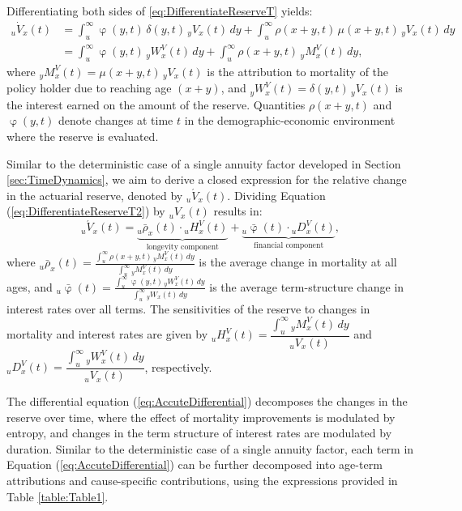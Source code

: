 \documentclass[12pt]{article}
\begin{document}
Differentiating both sides of \eqref{eq:DifferentiateReserveT} yields:
\begin{equation}\label{eq:DifferentiateReserveT2}
	\begin{split}
		{}_u\dot{V}_x(t) &= \int_u^\infty \upvarphi(y,t) \, \delta(y,t) \, {}_yV_x(t) \, dy + \int_u^\infty \rho(x+y,t) \, \mu(x+y,t) \, {}_yV_x(t) \, dy \\ 
		&= \int_u^\infty \upvarphi(y,t) \, {}_yW^V_x(t) \, dy + \int_u^\infty \rho(x+y,t) \, {}_yM^V_x(t) \, dy,
	\end{split}
\end{equation}
where ${}_yM^V_x(t) = \mu(x+y,t) \, {}_yV_x(t)$ is the attribution to mortality of the policy holder due to reaching age $(x+y)$, and ${}_yW^V_x(t) = \delta(y,t) \, {}_yV_x(t)$ is the interest earned on the amount of the reserve. Quantities $\rho(x+y,t)$ and $\upvarphi(y,t)$ denote changes at time $t$ in the demographic-economic environment where the reserve is evaluated. 


Similar to the deterministic case of a single annuity factor developed in Section \ref{sec:TimeDynamics}, we aim to derive a closed expression for the relative change in the actuarial reserve, denoted by ${}_u\acute{V}_x(t)$. Dividing Equation (\ref{eq:DifferentiateReserveT2}) by ${}_uV_x(t)$ results in:
\begin{equation}\label{eq:AccuteDifferential}
	{}_u\acute{V}_x(t) = \underbrace{{}_u\bar{\rho}_x(t) \cdot {}_uH_x^V(t)}_\text{longevity component} + \underbrace{{}_u\bar{\upvarphi}(t) \cdot {}_uD_x^V(t)}_\text{financial component},
\end{equation}
where ${}_u\bar{\rho}_x(t) = \frac{\int_u^\infty \rho(x+y,t) \, {}_yM^V_x(t) \, dy}{\int_u^\infty {}_yM^V_x(t) \, dy}$ is the average change in mortality at all ages, and ${}_u\bar{\upvarphi}(t) = \frac{\int_u^\infty \upvarphi(y,t) \, {}_yW^V_x(t) \, dy}{\int_u^\infty {}_yW_x(t) \, dy}$ is the average term-structure change in interest rates over all terms. The sensitivities of the reserve to changes in mortality and interest rates are given by ${}_uH_x^V(t) = \dfrac{\int_{u}^{\infty} {}_yM^V_x(t) \, dy}{{}_uV_x(t)}$ and ${}_uD_x^V(t) = \dfrac{\int_{u}^{\infty} {}_yW^V_x(t) \, dy}{{}_uV_x(t)}$, respectively.

The differential equation (\ref{eq:AccuteDifferential}) decomposes the changes in the reserve over time, where the effect of mortality improvements is modulated by entropy, and changes in the term structure of interest rates are modulated by duration. Similar to the deterministic case of a single annuity factor, each term in Equation (\ref{eq:AccuteDifferential}) can be further decomposed into age-term attributions and cause-specific contributions, using the expressions provided in Table \ref{table:Table1}.
\end{document}
